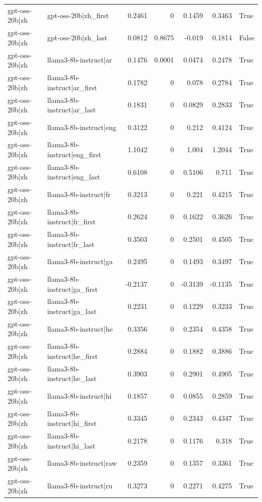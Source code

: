 \begin{table}
\begin{tabular}{l l r r r r l}
gpt-oss-20b|zh & gpt-oss-20b|zh_first & 0.2461 & 0 & 0.1459 & 0.3463 & True \\
gpt-oss-20b|zh & gpt-oss-20b|zh_last & 0.0812 & 0.8675 & -0.019 & 0.1814 & False \\
gpt-oss-20b|zh & llama3-8b-instruct|ar & 0.1476 & 0.0001 & 0.0474 & 0.2478 & True \\
gpt-oss-20b|zh & llama3-8b-instruct|ar_first & 0.1782 & 0 & 0.078 & 0.2784 & True \\
gpt-oss-20b|zh & llama3-8b-instruct|ar_last & 0.1831 & 0 & 0.0829 & 0.2833 & True \\
gpt-oss-20b|zh & llama3-8b-instruct|eng & 0.3122 & 0 & 0.212 & 0.4124 & True \\
gpt-oss-20b|zh & llama3-8b-instruct|eng_first & 1.1042 & 0 & 1.004 & 1.2044 & True \\
gpt-oss-20b|zh & llama3-8b-instruct|eng_last & 0.6108 & 0 & 0.5106 & 0.711 & True \\
gpt-oss-20b|zh & llama3-8b-instruct|fr & 0.3213 & 0 & 0.221 & 0.4215 & True \\
gpt-oss-20b|zh & llama3-8b-instruct|fr_first & 0.2624 & 0 & 0.1622 & 0.3626 & True \\
gpt-oss-20b|zh & llama3-8b-instruct|fr_last & 0.3503 & 0 & 0.2501 & 0.4505 & True \\
gpt-oss-20b|zh & llama3-8b-instruct|ga & 0.2495 & 0 & 0.1493 & 0.3497 & True \\
gpt-oss-20b|zh & llama3-8b-instruct|ga_first & -0.2137 & 0 & -0.3139 & -0.1135 & True \\
gpt-oss-20b|zh & llama3-8b-instruct|ga_last & 0.2231 & 0 & 0.1229 & 0.3233 & True \\
gpt-oss-20b|zh & llama3-8b-instruct|he & 0.3356 & 0 & 0.2354 & 0.4358 & True \\
gpt-oss-20b|zh & llama3-8b-instruct|he_first & 0.2884 & 0 & 0.1882 & 0.3886 & True \\
gpt-oss-20b|zh & llama3-8b-instruct|he_last & 0.3903 & 0 & 0.2901 & 0.4905 & True \\
gpt-oss-20b|zh & llama3-8b-instruct|hi & 0.1857 & 0 & 0.0855 & 0.2859 & True \\
gpt-oss-20b|zh & llama3-8b-instruct|hi_first & 0.3345 & 0 & 0.2343 & 0.4347 & True \\
gpt-oss-20b|zh & llama3-8b-instruct|hi_last & 0.2178 & 0 & 0.1176 & 0.318 & True \\
gpt-oss-20b|zh & llama3-8b-instruct|raw & 0.2359 & 0 & 0.1357 & 0.3361 & True \\
gpt-oss-20b|zh & llama3-8b-instruct|ru & 0.3273 & 0 & 0.2271 & 0.4275 & True \\

\end{tabular}
\end{table}
